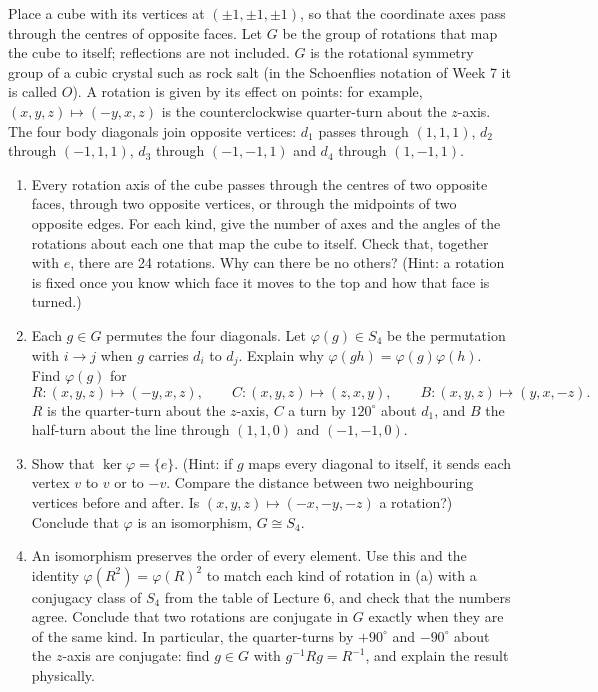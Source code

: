 \documentclass[11pt,a4paper]{article}
\newcommand{\problem}[1]{\par\vspace{0.9em}\noindent{\bfseries #1}\par\vspace{0.1em}}
\begin{document}
\problem{5. Rotations of a cube}
Place a cube with its vertices at $(\pm1, \pm1, \pm1)$, so that the coordinate axes pass through the centres of opposite faces. Let $G$ be the group of rotations that map the cube to itself; reflections are not included. $G$ is the rotational symmetry group of a cubic crystal such as rock salt (in the Schoenflies notation of Week 7 it is called $O$). A rotation is given by its effect on points: for example, $(x, y, z) \mapsto (-y, x, z)$ is the counterclockwise quarter-turn about the $z$-axis. The four body diagonals join opposite vertices: $d_1$ passes through $(1, 1, 1)$, $d_2$ through $(-1, 1, 1)$, $d_3$ through $(-1, -1, 1)$ and $d_4$ through $(1, -1, 1)$.
\begin{enumerate}
  \item Every rotation axis of the cube passes through the centres of two opposite faces, through two opposite vertices, or through the midpoints of two opposite edges. For each kind, give the number of axes and the angles of the rotations about each one that map the cube to itself. Check that, together with $e$, there are 24 rotations. Why can there be no others? (Hint: a rotation is fixed once you know which face it moves to the top and how that face is turned.)
  \item Each $g \in G$ permutes the four diagonals. Let $\varphi(g) \in S_4$ be the permutation with $i \to j$ when $g$ carries $d_i$ to $d_j$. Explain why $\varphi(gh) = \varphi(g)\varphi(h)$. Find $\varphi(g)$ for
  \[
    R\colon (x, y, z) \mapsto (-y, x, z), \qquad
    C\colon (x, y, z) \mapsto (z, x, y), \qquad
    B\colon (x, y, z) \mapsto (y, x, -z).
  \]
  $R$ is the quarter-turn about the $z$-axis, $C$ a turn by $120^\circ$ about $d_1$, and $B$ the half-turn about the line through $(1, 1, 0)$ and $(-1, -1, 0)$.
  \item Show that $\ker\varphi = \{e\}$. (Hint: if $g$ maps every diagonal to itself, it sends each vertex $v$ to $v$ or to $-v$. Compare the distance between two neighbouring vertices before and after. Is $(x, y, z) \mapsto (-x, -y, -z)$ a rotation?) Conclude that $\varphi$ is an isomorphism, $G \cong S_4$.
  \item An isomorphism preserves the order of every element. Use this and the identity $\varphi(R^2) = \varphi(R)^2$ to match each kind of rotation in (a) with a conjugacy class of $S_4$ from the table of Lecture 6, and check that the numbers agree. Conclude that two rotations are conjugate in $G$ exactly when they are of the same kind. In particular, the quarter-turns by $+90^\circ$ and $-90^\circ$ about the $z$-axis are conjugate: find $g \in G$ with $g^{-1} R g = R^{-1}$, and explain the result physically.

\end{enumerate}
\end{document}
